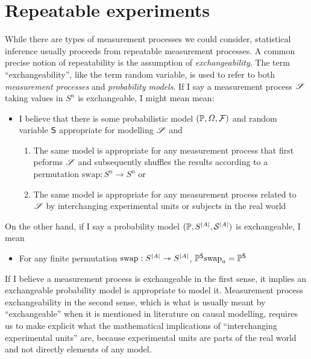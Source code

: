
\section{Repeatable experiments}

While there are types of measurement processes we could consider, statistical inference usually proceeds from repeatable measurement processes. A common precise notion of repeatability is the assumption of \emph{exchangeability}. The term ``exchangeability'', like the term random variable, is used to refer to both \emph{measurement processes} and \emph{probability models}. If I say a measurement process $\mathscr{S}$ taking values in $S^n$ is exchangeable, I might mean mean:
\begin{itemize}
    \item I believe that there is some probabilistic model $(\mathbb{P},\Omega,\mathcal{F})$ and random variable $\mathsf{S}$ appropriate for modelling $\mathscr{S}$ and
    \begin{enumerate}
        \item The same model is appropriate for any measurement process that first peforms $\mathscr{S}$ and subsequently shuffles the results according to a permutation $\text{swap}:S^n\to S^n$ or
        \item The same model is appropriate for any measurement process related to $\mathscr{S}$ by interchanging experimental units or subjects in the real world
    \end{enumerate} 
\end{itemize}

On the other hand, if I say a probability model $(\mathbb{P},S^{|A|},\mathcal{S}^{|A|})$ is exchangeable, I mean

\begin{itemize}
    \item For any finite permutation $\text{swap}:S^{|A|}\rightarrowtriangle S^{|A|}$, $\mathbb{P}^{\mathsf{S}}\text{swap}_{a} = \mathbb{P}^{\mathsf{S}}$
\end{itemize}

If I believe a measurement process is exchangeable in the first sense, it implies an exchangeable probability model is appropriate to model it. Measurement process exchangeability in the second sense, which is what is usually meant by ``exchangeable'' when it is mentioned in literature on causal modelling, requires us to make explicit what the mathematical implications of ``interchanging experimental units'' are, because experimental units are parts of the real world and not directly elements of any model.

